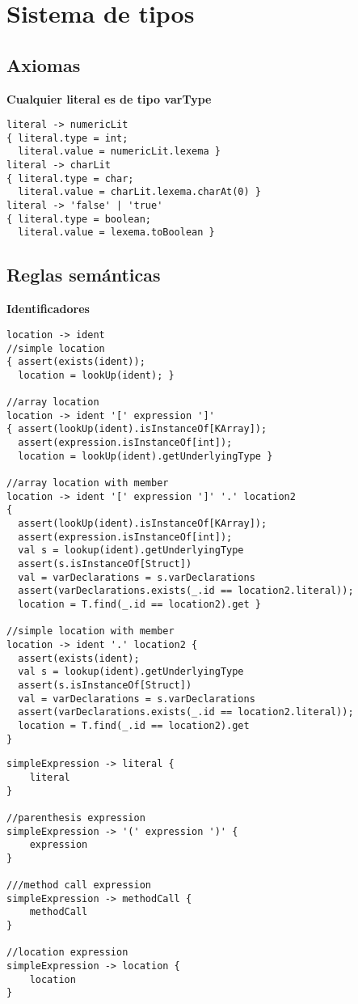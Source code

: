 \documentclass[12pt,letterpaper]{article}
\begin{document}
\section*{Sistema de tipos}
\subsection*{Axiomas}

\textbf{Cualquier literal es de tipo varType}
\begin{lstlisting}
literal -> numericLit
{ literal.type = int;
  literal.value = numericLit.lexema }
literal -> charLit
{ literal.type = char;
  literal.value = charLit.lexema.charAt(0) }
literal -> 'false' | 'true'
{ literal.type = boolean;
  literal.value = lexema.toBoolean }
\end{lstlisting}

\subsection*{Reglas sem\'{a}nticas}
\textbf{Identificadores}
\begin{lstlisting}
location -> ident
//simple location
{ assert(exists(ident));
  location = lookUp(ident); }  

//array location
location -> ident '[' expression ']' 
{ assert(lookUp(ident).isInstanceOf[KArray]);
  assert(expression.isInstanceOf[int]);
  location = lookUp(ident).getUnderlyingType }

//array location with member
location -> ident '[' expression ']' '.' location2
{ 
  assert(lookUp(ident).isInstanceOf[KArray]);  
  assert(expression.isInstanceOf[int]);
  val s = lookup(ident).getUnderlyingType
  assert(s.isInstanceOf[Struct])
  val = varDeclarations = s.varDeclarations
  assert(varDeclarations.exists(_.id == location2.literal));
  location = T.find(_.id == location2).get }

//simple location with member
location -> ident '.' location2 { 
  assert(exists(ident);  
  val s = lookup(ident).getUnderlyingType
  assert(s.isInstanceOf[Struct])
  val = varDeclarations = s.varDeclarations
  assert(varDeclarations.exists(_.id == location2.literal));
  location = T.find(_.id == location2).get 
}
\end{lstlisting}

\begin{lstlisting}
simpleExpression -> literal {
	literal
}

//parenthesis expression
simpleExpression -> '(' expression ')' {
	expression
}

///method call expression
simpleExpression -> methodCall {
	methodCall
}

//location expression
simpleExpression -> location {
	location
}

\end{lstlisting}
\end{document}
